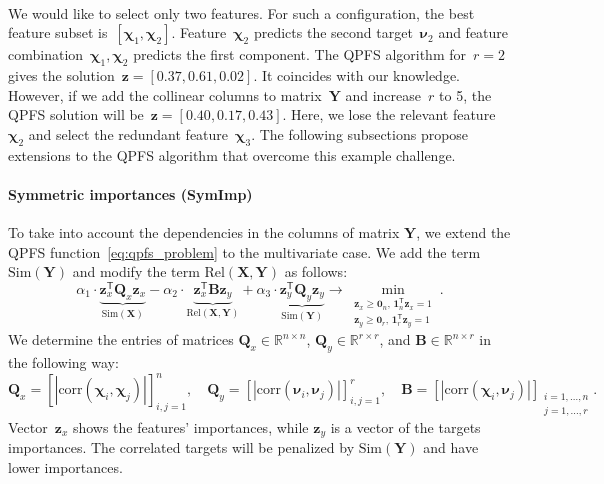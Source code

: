 \documentclass[preprint,authoryear,12pt]{elsarticle}
\theoremstyle{definition}
\newcommand{\bz}{\mathbf{z}}
\newcommand{\bY}{\mathbf{Y}}
\newcommand{\bX}{\mathbf{X}}
\newcommand{\bB}{\mathbf{B}}
\newcommand{\bQ}{\mathbf{Q}}
\newcommand{\bbR}{\mathbb{R}}
\newcommand{\T}{\mathsf{T}}
\newcommand{\bchi}{\boldsymbol{\chi}}
\newcommand{\bnu}{\boldsymbol{\nu}}
\newcommand{\bOne}{\boldsymbol{1}}
\newcommand{\bZero}{\boldsymbol{0}}
\begin{document}
\vspace{0.5cm} \\
We would like to select only two features.
For such a configuration, the best feature subset is~$[\bchi_1, \bchi_2]$.
Feature~$\bchi_2$ predicts the second target~$\bnu_2$ and feature combination~$\bchi_1, \bchi_2$ predicts the first component.
The QPFS algorithm for~$r=2$ gives the solution~$\bz = [0.37,	0.61,	0.02]$. It coincides with our knowledge.
However, if we add the collinear columns to matrix~$\bY$ and increase~$r$ to 5, the QPFS solution will be~$\bz = [0.40,	0.17, 0.43]$.
Here, we lose the relevant feature~$\bchi_2$ and select the redundant feature~$\bchi_3$.
The following subsections propose extensions to the QPFS algorithm that overcome this example challenge.

\paragraph{Symmetric importances (SymImp)}

To take into account the dependencies in the columns of matrix $\bY$, we extend the QPFS function~\eqref{eq:qpfs_problem} to the multivariate case.
We add the term~$\text{Sim}(\bY)$ and modify the term $\text{Rel}(\bX, \bY)$ as follows:
\begin{equation}
\alpha_1 \cdot \underbrace{\bz_x^{\T} \bQ_x \bz_x}_{\text{Sim}(\bX)} - \alpha_2 \cdot \underbrace{\bz_x^{\T} \bB \bz_y}_{\text{Rel}(\bX, \bY)} + \alpha_3 \cdot \underbrace{\bz_y^{\T} \bQ_y \bz_y}_{\text{Sim}(\bY)} \rightarrow \min_{\substack{\bz_x \geq \bZero_n, \, \bOne_n^{\T}\bz_x=1 \\ \bz_y \geq \bZero_r, \, \bOne_r^{\T}\bz_y=1}}.
\label{eq:symimp}
\end{equation}
We determine the entries of matrices $\bQ_x \in \bbR^{n \times n}$, $\bQ_y \in \bbR^{r \times r}$, and $\bB \in \bbR^{n \times r}$ in the following way:
\begin{equation*}
\bQ_x = \left[ |\text{corr}(\bchi_i, \bchi_j)| \right]_{i,j=1}^n, \quad
\bQ_y = \left[ |\text{corr}(\bnu_i, \bnu_j)| \right]_{i,j=1}^r, \quad
\bB =  \left[ |\text{corr}(\bchi_i, \bnu_j)| \right]_{\substack{i=1, \dots, n \\ j=1, \dots, r}}.
\end{equation*}
Vector~$\bz_x$ shows the features' importances, while $\bz_y$ is a vector of the targets importances.
The correlated targets will be penalized by $\text{Sim} (\bY)$ and have lower importances.
\end{document}
